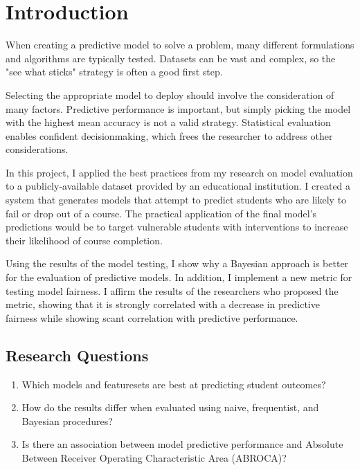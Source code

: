 \documentclass{article}
\begin{document}
\section{Introduction}
        When creating a predictive model to solve a problem, many different formulations and algorithms are typically tested.
        Datasets can be vast and complex, so the "see what sticks" strategy is often a good first step.

        Selecting the appropriate model to deploy should involve the consideration of many factors.
        Predictive performance is important, but simply picking the model with the highest mean accuracy is not a valid strategy.
        Statistical evaluation enables confident decisionmaking, which frees the researcher to address other considerations.

        In this project, I applied the best practices from my research on model evaluation to a publicly-available dataset provided by an educational institution.
        I created a system that generates models that attempt to predict students who are likely to fail or drop out of a course.
        The practical application of the final model's predictions would be to target vulnerable students with interventions to increase their likelihood of course completion. 

        Using the results of the model testing, I show why a Bayesian approach is better for the evaluation of predictive models. 
        In addition, I implement a new metric for testing model fairness. 
        I affirm the results of the researchers who proposed the metric, showing that it is strongly correlated with a decrease in predictive fairness while showing scant correlation with predictive performance.
    
    \subsection{Research Questions}
        \begin{enumerate}
            \item Which models and featuresets are best at predicting student outcomes?
            \item How do the results differ when evaluated using naive, frequentist, and Bayesian procedures?
            \item Is there an association between model predictive performance and Absolute Between Receiver Operating Characteristic Area (ABROCA)?
        \end{enumerate}
    
\end{document}
